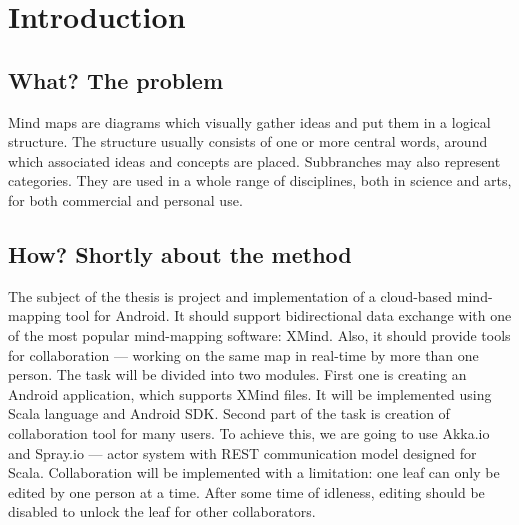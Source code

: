 %
%
%
%
%

\chapter{Introduction}
\label{chap:introduction}

\section{What? The problem}
\label{sec:what}

Mind maps are diagrams which visually gather ideas and put them in a logical structure. The structure usually consists of one or more central words, around which associated ideas and concepts are placed. Subbranches may also represent categories. They are used in a whole range of disciplines, both in science and arts, for both commercial and personal use. \cite{Gee:2010:Roots}

\section{How? Shortly about the method}
\label{sec:how}

The subject of the thesis is project and implementation of a cloud-based mind-mapping tool for Android. It should support bidirectional data exchange with one of the most popular mind-mapping software: XMind. Also, it should provide tools for collaboration --- working on the same map in real-time by more than one person. The task will be divided into two modules. First one is creating an Android application, which supports XMind files. It will be implemented using Scala language and Android SDK. Second part of the task is creation of collaboration tool for many users. To achieve this, we are going to use Akka.io and Spray.io --- actor system with REST communication model designed for Scala. Collaboration will be implemented with a limitation: one leaf can only be edited by one person at a time. After some time of idleness, editing should be disabled to unlock the leaf for other collaborators.

